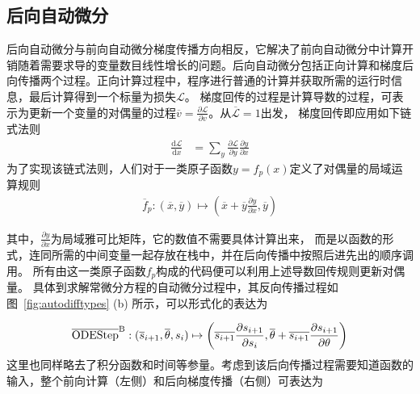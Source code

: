 \documentclass[A4,twoside,fontset=ubuntu,UTF8]{ctexart}
\def\D{\mathrm{d}}
\begin{document}
\subsection{后向自动微分}
后向自动微分与前向自动微分梯度传播方向相反，它解决了前向自动微分中计算开销随着需要求导的变量数目线性增长的问题。后向自动微分包括正向计算和梯度后向传播两个过程。正向计算过程中，程序进行普通的计算并获取所需的运行时信息，最后计算得到一个标量为损失$\mathcal{L}$。
梯度回传的过程是计算导数的过程，可表示为更新一个变量的对偶量的过程$\overline{v} = \frac{\partial \mathcal{L}}{\partial v}$。从$\overline{\mathcal L} = 1$出发，
梯度回传即应用如下链式法则
\begin{align*}
    \frac{\D \mathcal{L}}{\D x} &= \sum_y\frac{\partial \mathcal{L}}{\partial y}\frac{\partial y}{\partial x}
\end{align*}
为了实现该链式法则，人们对于一类原子函数$y=f_p(x)$定义了对偶量的局域运算规则
\begin{align*}
    \overline f_p: (\overline x, \overline y) \mapsto (\overline x + \overline y\frac{\partial y}{\partial x}, \overline y)
\end{align*}

其中，$\frac{\partial y}{\partial x}$为局域雅可比矩阵，它的数值不需要具体计算出来，
而是以函数的形式，连同所需的中间变量一起存放在栈中，并在后向传播中按照后进先出的顺序调用。
所有由这一类原子函数$f_p$构成的代码便可以利用上述导数回传规则更新对偶量。
具体到求解常微分方程的自动微分过程中，其反向传播过程如图~\ref{fig:autodifftypes} (b) 所示，可以形式化的表达为

\begin{align*}
    \overline{\rm ODEStep}^{\rm B} : (\overline s_{i+1}, \overline\theta, s_i) \mapsto %
    \left(\overline{s_{i+1}}\frac{\partial s_{i+1}}{\partial s_{i}}
    ,\overline{\theta} + \overline{s_{i+1}}\frac{\partial s_{i+1}}{\partial \theta}\right)%
\end{align*}
这里也同样略去了积分函数和时间等参量。考虑到该后向传播过程需要知道函数的输入，整个前向计算（左侧）和后向梯度传播（右侧）可表达为
\end{document}
